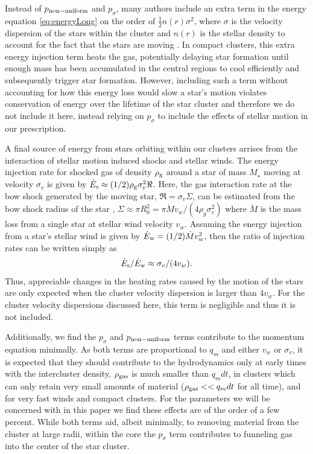 \documentclass[fleqn,usenatbib]{mnras}
\begin{document}
 Instead of $p_{\rm non-uniform}$ and $p_\sigma$, many authors include an extra term in the energy equation \ref{eq:energyLong} on the order of $\frac{1}{2} n(r) \sigma^2$, where $\sigma$ is the velocity dispersion of the stars within the cluster and $n(r)$ is the stellar density to account for the fact that the stars are moving \citep{faulk1977,smith1999,dercole2008,priestley2011}. 
 In compact clusters, this extra energy injection term heats the gas, potentially delaying star formation until enough mass has been accumulated in the central regions to cool efficiently and subsequently trigger star formation.
 However, including such a term without accounting for how this energy loss would slow a star's motion violates conservation of energy over the lifetime of the star cluster and therefore we do not include it here, instead relying on $p_\sigma$ to include the effects of stellar motion in our prescription. 

 A final source of energy from stars orbiting within our clusters arrises from the interaction of stellar motion induced shocks and stellar winds.
 The energy injection rate for shocked gas of density $\rho_{\rm g}$ around a star of mass $M_\star$ moving at velocity $\sigma_v$ is given by $\dot{E}_{\rm s} \approx (1/2) \rho_{\rm g} \sigma_v^2 \Re$.  
 Here, the gas interaction rate at the bow shock generated by the moving star, $\Re = \sigma_v \Sigma$, can be estimated from the bow shock radius of the star \citep{wilkin1996}, $\Sigma \approx \pi R_0^2 = \pi \dot{M} v_w/(4 \rho_g \sigma_v^2)$ where $\dot{M}$ is the mass loss from a single star at stellar wind velocity $v_w$.
 Assuming the energy injection from a star's stellar wind is given by  $\dot{E}_{\rm w} = (1/2) \dot{M} v_w^2$, then the ratio of injection rates can be written simply as 
\begin{equation}
\dot{E}_{\rm s}/\dot{E}_{\rm w} \approx \sigma_v/(4 v_w).
\label{eq:esew}
\end{equation}
 Thus, appreciable changes in the heating rates caused by the motion of the stars are only expected when the cluster velocity dispersion is  larger than $4v_w$. 
 For the cluster velocity dispersions discussed here, this term is negligible and thus it is not included.

 Additionally, we find the $p_\sigma$ and $p_{\rm non-uniform}$ terms contribute to the momentum equation minimally. As both terms are proportional to $q_m$ and either $v_w$ or $\sigma_v$, it is expected that they should contribute to the hydrodynamics only at early times with the intercluster density, $\rho_{\rm gas}$ is much smaller than $q_m dt$, in clusters which can only retain very small amounts of material ($\rho_{\rm gas} << q_m dt$ for all time), and for very fast winds and compact clusters.  For the parameters we will be concerned with in this paper we find these effects are of the order of a few percent. While both terms aid, albeit minimally, to removing material from the cluster at large radii, within the core the $p_\sigma$ term contributes to funneling gas into the center of the star cluster.
\end{document}
